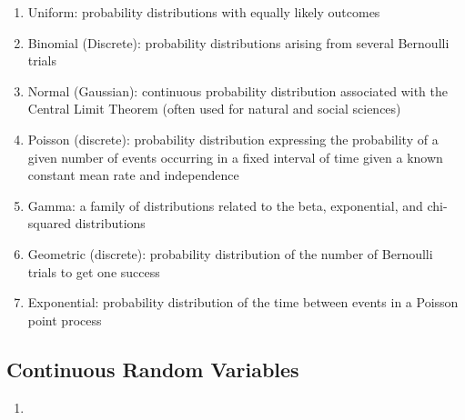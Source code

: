 \documentclass{article}
\begin{document}
\begin{enumerate}
    \item Uniform: probability distributions with equally likely outcomes
    \item Binomial (Discrete): probability distributions arising from several Bernoulli trials
    \item Normal (Gaussian): continuous probability distribution associated with the Central Limit Theorem (often used for natural and social sciences)
    \item Poisson (discrete): probability distribution expressing the probability of a given number of events occurring in a fixed interval of time given a known constant mean rate and independence
    \item Gamma: a family of distributions related to the beta, exponential, and chi-squared distributions
    \item Geometric (discrete): probability distribution of the number of Bernoulli trials to get one success  
    \item Exponential: probability distribution of the time between events in a Poisson point process
\end{enumerate}

\subsection{Continuous Random Variables}
\begin{enumerate}
    \item 
\end{enumerate}
\end{document}
